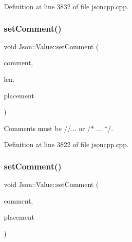 Definition at line 3832 of file jsoncpp.\+cpp.

\hypertarget{class_json_1_1_value_a2900152a2887b410a9ddabe278b9d492}{}\label{class_json_1_1_value_a2900152a2887b410a9ddabe278b9d492} 
\subsubsection{\texorpdfstring{set\+Comment()}{setComment()}\hspace{0.1cm}{\footnotesize\ttfamily [5/6]}}
{\footnotesize\ttfamily void Json\+::\+Value\+::set\+Comment (\begin{DoxyParamCaption}\item[{const char $\ast$}]{comment,  }\item[{size\+\_\+t}]{len,  }\item[{\hyperlink{namespace_json_a4fc417c23905b2ae9e2c47d197a45351}{Comment\+Placement}}]{placement }\end{DoxyParamCaption})}



Comments must be //... or /$\ast$ ... $\ast$/. 



Definition at line 3822 of file jsoncpp.\+cpp.

\hypertarget{class_json_1_1_value_a2c5d13a5f45eb77e912008778e65b27f}{}\label{class_json_1_1_value_a2c5d13a5f45eb77e912008778e65b27f} 
\subsubsection{\texorpdfstring{set\+Comment()}{setComment()}\hspace{0.1cm}{\footnotesize\ttfamily [6/6]}}
{\footnotesize\ttfamily void Json\+::\+Value\+::set\+Comment (\begin{DoxyParamCaption}\item[{const \hyperlink{config_8h_a1e723f95759de062585bc4a8fd3fa4be}{J\+S\+O\+N\+C\+P\+P\+\_\+\+S\+T\+R\+I\+NG} \&}]{comment,  }\item[{\hyperlink{namespace_json_a4fc417c23905b2ae9e2c47d197a45351}{Comment\+Placement}}]{placement }\end{DoxyParamCaption})}



